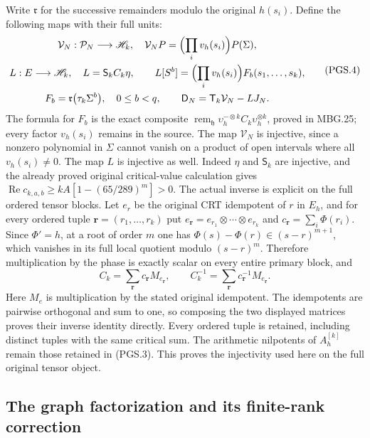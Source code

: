 Write \(\mathfrak r\) for the successive remainders modulo the
original \(h(s_i)\). Define the following maps with their full units:
\[
\begin{gathered}
 \mathcal V_N:\mathcal P_N\longrightarrow\mathscr H_k,\quad
 \mathcal V_NP=\Bigl(\prod_i v_h(s_i)\Bigr)P(\Sigma),\\
 L:E\longrightarrow\mathscr H_k,\quad L=\mathsf S_k C_k\eta,
 \qquad L[S^b]=\Bigl(\prod_i v_h(s_i)\Bigr)F_b(s_1,\ldots,s_k),\\
 F_b=\mathfrak r\bigl(\tau_k\Sigma^b\bigr),\quad0\le b<q,
 \qquad\mathsf D_N=\mathsf T_k\mathcal V_N-LJ_N.
\end{gathered}
\tag{PGS.4}\label{eq:pgs-VL}
\]
The formula for \(F_b\) is the exact composite
\(\operatorname{rem}_{\mathfrak h}\upsilon_h^{-\otimes k}
C_k\upsilon_h^{\otimes k}\), proved in MBG.25; every factor
\(v_h(s_i)\) remains in the source. The map \(\mathcal V_N\) is
injective, since a nonzero polynomial in \(\Sigma\) cannot vanish
on a product of open intervals where all \(v_h(s_i)\ne0\).
The map \(L\) is injective as well. Indeed \(\eta\) and
\(\mathsf S_k\) are injective, and the already proved original
critical-value calculation gives
\(\operatorname{Re}c_{k,a,b}\ge
kA[1-(65/289)^m]>0\).
The actual inverse is explicit on the full ordered tensor blocks.
Let \(e_r\) be the original CRT idempotent of \(r\) in \(E_h\),
and for every ordered tuple \(\boldsymbol r=(r_1,\ldots,r_k)\)
put \(e_{\boldsymbol r}=e_{r_1}\otimes\cdots\otimes e_{r_k}\)
and \(c_{\boldsymbol r}=\sum_i\Phi(r_i)\). Since \(\Phi'=h\),
at a root of order \(m\) one has
\(\Phi(s)-\Phi(r)\in(s-r)^{m+1}\), which vanishes in its full
local quotient modulo \((s-r)^m\). Therefore multiplication by
the phase is exactly scalar on every entire primary block, and
\[
 C_k=\sum_{\boldsymbol r}c_{\boldsymbol r}M_{e_{\boldsymbol r}},
 \qquad
 C_k^{-1}=\sum_{\boldsymbol r}c_{\boldsymbol r}^{-1}
                                  M_{e_{\boldsymbol r}}.
\]
Here \(M_e\) is multiplication by the stated original idempotent.
The idempotents are pairwise orthogonal and sum to one, so composing
the two displayed matrices proves their inverse identity directly.
Every ordered tuple is retained, including distinct tuples with the
same critical sum. The arithmetic nilpotents of \(A_h^{[k]}\)
remain those retained in (PGS.3). This proves
the injectivity used here on the full original tensor object.

\subsection{The graph factorization and its finite-rank correction}

